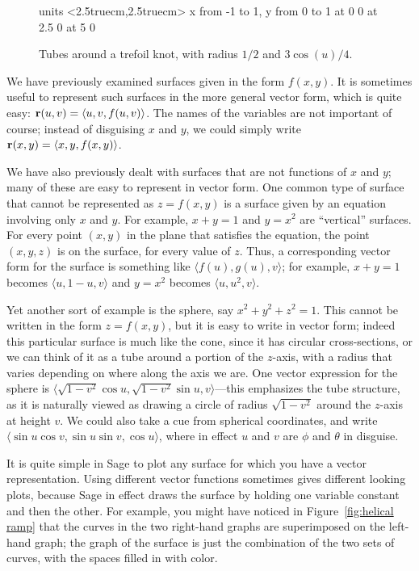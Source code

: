 \begin{figure}[H]
\centerline{
\vbox{\beginpicture
\normalgraphs
\setcoordinatesystem units <2.5truecm,2.5truecm>
\setplotarea x from -1 to 1, y from 0 to 1
 at 0 0
 at 2.5 0
 at 5 0
\endpicture}}
\caption{Tubes around a trefoil knot, with radius $1/2$ and $3\cos(u)/4$. \label{fig:trefoil}}
\end{figure}

We have previously examined surfaces given in the form 
$f(x,y)$. It is sometimes useful to represent such surfaces in the
more general vector form, which is quite easy:
${\bf r}(u,v)=\langle u,v,f(u,v)\rangle$. The names of the variables
are not important of course; instead of disguising $x$ and $y$, we
could simply write ${\bf r}(x,y)=\langle x,y,f(x,y)\rangle$. 

We have also previously dealt with surfaces that are not functions of
$x$ and $y$; many of these are easy to represent in vector form.
One common type of surface that cannot be represented as $z=f(x,y)$ is
a surface given by an equation involving only $x$ and $y$. For
example,
$x+y=1$ and $y=x^2$ are ``vertical'' surfaces. For every point $(x,y)$
in the plane that satisfies the equation, the point $(x,y,z)$ is on
the surface, for 
every value of $z$. Thus, a corresponding vector form for the surface
is something like $\langle f(u),g(u),v\rangle$; for example, $x+y=1$
becomes $\langle u,1-u,v\rangle$ and $y=x^2$ becomes $\langle
u,u^2,v\rangle$. 

Yet another sort of example is the sphere, say $x^2+y^2+z^2=1$. This
cannot be written in the form $z=f(x,y)$, but it is easy to write in
vector form; indeed this particular surface is much like the cone,
since it has circular cross-sections, or we can think of it as a tube
around a portion of the $z$-axis, with a radius that varies depending
on where along the axis we are. One vector expression for the sphere
is $\langle \sqrt{1-v^2}\cos u,\sqrt{1-v^2}\sin u, v\rangle$---this
emphasizes the tube structure, as it is naturally viewed as drawing a
circle of radius $\sqrt{1-v^2}$ around the $z$-axis at height $v$.
We could also take a cue from spherical coordinates, and write
$\langle \sin u\cos v,\sin u\sin v,\cos u\rangle$, where in effect
$u$ and $v$ are $\phi$ and $\theta$ in disguise. 

It is quite simple in Sage to plot any surface for which you have a
vector representation. Using different vector functions sometimes
gives different looking plots, because Sage in effect draws the
surface by holding one variable constant and then the other. For
example, you might have noticed in Figure~\ref{fig:helical ramp}
that the curves in the two right-hand graphs are superimposed on the
left-hand graph; the graph of the surface is just the combination of
the two sets of curves, with the spaces filled in with color. 

